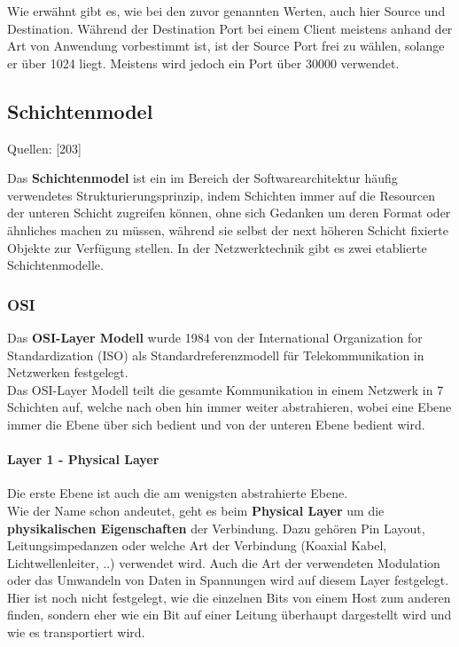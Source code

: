 \documentclass[12pt,a4paper]{report}
\begin{document}
\begin{onehalfspace}
Wie erwähnt gibt es, wie bei den zuvor genannten Werten, auch hier Source und Destination. Während der Destination Port bei einem Client meistens anhand der Art von Anwendung vorbestimmt ist, ist der Source Port frei zu wählen, solange er über 1024 liegt. Meistens wird jedoch ein Port über 30000 verwendet. 

\subsection*{Schichtenmodel}
\begin{flushright}
\begin{tiny}
Quellen: [203]
\end{tiny}
\end{flushright}
Das \textbf{Schichtenmodel} ist ein im Bereich der Softwarearchitektur häufig verwendetes Strukturierungsprinzip, indem Schichten immer auf die Resourcen der unteren Schicht zugreifen können, ohne sich Gedanken um deren Format oder ähnliches machen zu müssen, während sie selbst der next höheren Schicht fixierte Objekte zur Verfügung stellen. In der Netzwerktechnik gibt es zwei etablierte Schichtenmodelle.
\subsubsection{OSI}
Das \textbf{OSI-Layer Modell} wurde 1984 von der International Organization for Standardization (ISO) als Standardreferenzmodell für Telekommunikation in Netzwerken festgelegt.\\
Das OSI-Layer Modell teilt die gesamte Kommunikation in einem Netzwerk in 7 Schichten auf, welche nach oben hin immer weiter abstrahieren, wobei eine Ebene immer die Ebene über sich bedient und von der unteren Ebene bedient wird.\\
\paragraph{Layer 1 - Physical Layer}
Die erste Ebene ist auch die am wenigsten abstrahierte Ebene.\\
Wie der Name schon andeutet, geht es beim \textbf{Physical Layer} um die \textbf{physikalischen Eigenschaften} der Verbindung. Dazu gehören Pin Layout, Leitungsimpedanzen oder welche Art der Verbindung (Koaxial Kabel, Lichtwellenleiter, ..) verwendet wird. Auch die Art der verwendeten Modulation oder das Umwandeln von Daten in Spannungen wird auf diesem Layer festgelegt.\\
Hier ist noch nicht festgelegt, wie die einzelnen Bits von einem Host zum anderen finden, sondern eher wie ein Bit auf einer Leitung überhaupt dargestellt wird und wie es transportiert wird.\\


\end{onehalfspace}
\end{document}
